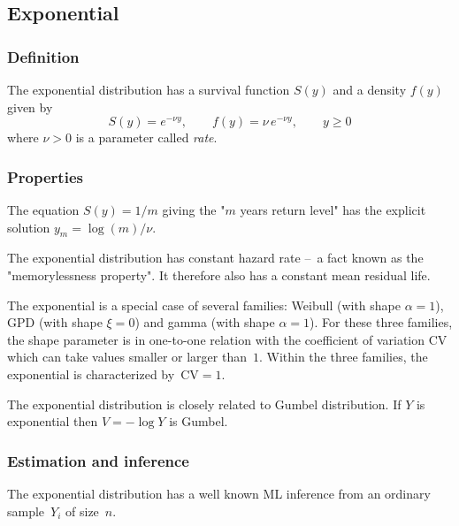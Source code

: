 \documentclass[a4paper]{report}
\begin{document}
\subsection{Exponential}
\subsubsection*{Definition}
The exponential distribution has a survival function $S(y)$ and a density $f(y)$ given by
\begin{equation}
  \label{eq:defExp}
  S(y) = e^{-\nu y}, \qquad f(y) = \nu\, e^{-\nu y}, \qquad y \geqslant 0
\end{equation}
where $\nu>0$ is a parameter called \textit{rate}. 

\subsubsection*{Properties}
The equation  $S(y)=1/m$ giving the "$m$ years return level" has the explicit 
solution $y_m = \log(m)/\nu$.

The exponential distribution has constant hazard rate --~a fact known as the
"memorylessness property".  It therefore also has a constant mean residual life.

The exponential is a special case of several families: Weibull (with
shape $\alpha=1$), GPD (with shape $\xi = 0$) and gamma (with shape
$\alpha=1$).  For these three families, the shape parameter is in
one-to-one relation with the coefficient of variation CV which can
take values smaller or larger than~$1$. Within the three families, the
exponential is characterized by~$\textrm{CV}=1$.  

The exponential distribution is closely related to Gumbel distribution. 
If $Y$ is exponential then $V=-\log Y$ is Gumbel.


\subsubsection*{Estimation and inference}
The exponential distribution has a well known ML inference from an
ordinary sample~$Y_i$ of size~$n$.
\end{document}
